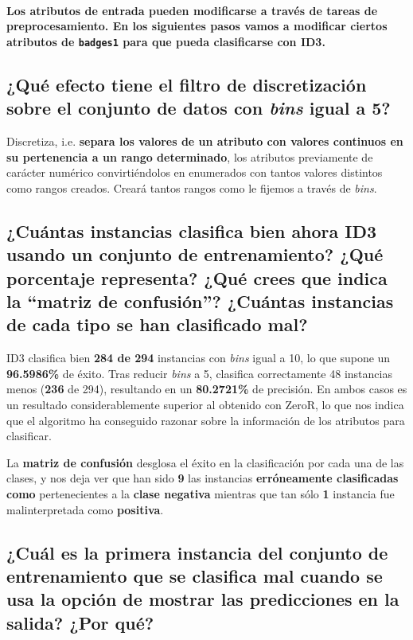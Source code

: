\documentclass[12pt]{article}
\begin{document}
\paragraph{\small Los atributos de entrada pueden modificarse a través de
tareas de preprocesamiento. En los siguientes pasos vamos a modificar ciertos
atributos de \texttt{badges1} para que pueda clasificarse con ID3.}

\subsection*{\small ¿Qué efecto tiene el filtro de discretización sobre el
conjunto de datos con \emph{bins} igual a 5?}

Discretiza, i.e. \textbf{separa los valores de un atributo con valores
continuos en su pertenencia a un rango determinado}, los atributos previamente
de carácter numérico convirtiéndolos en enumerados con tantos valores distintos
como rangos creados. Creará tantos rangos como le fijemos a través de
\emph{bins}.

\subsection*{\small ¿Cuántas instancias clasifica bien ahora ID3 usando un
conjunto de entrenamiento? ¿Qué porcentaje representa? ¿Qué crees que indica
la ``matriz de confusión''? ¿Cuántas instancias de cada tipo se han clasificado
mal?}

ID3 clasifica bien \textbf{284 de 294} instancias con \emph{bins} igual a 10,
lo que supone un \textbf{96.5986\%} de éxito. Tras reducir \emph{bins} a 5,
clasifica correctamente 48 instancias menos (\textbf{236} de 294), resultando
en un \textbf{80.2721\%} de precisión. En ambos casos es un resultado
considerablemente superior al obtenido con ZeroR, lo que nos indica que el
algoritmo ha conseguido razonar sobre la información de los atributos para
clasificar.

La \textbf{matriz de confusión} desglosa el éxito en la clasificación por cada
una de las clases, y nos deja ver que han sido \textbf{9} las instancias
\textbf{erróneamente clasificadas como} pertenecientes a la \textbf{clase
negativa} mientras que tan sólo \textbf{1} instancia fue malinterpretada como
\textbf{positiva}.

\subsection*{\small ¿Cuál es la primera instancia del conjunto de entrenamiento
que se clasifica mal cuando se usa la opción de mostrar las predicciones en la
salida? ¿Por qué?}
\end{document}
